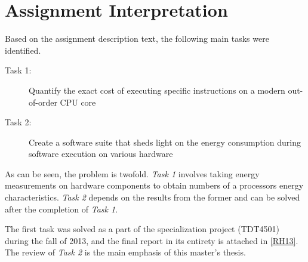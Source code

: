 \section{Assignment Interpretation}

Based on the assignment description text, the following main tasks were
identified.

\begin{description}
    \item[Task 1:] Quantify the exact cost of executing specific instructions on
        a modern out-of-order CPU core
    \item[Task 2:] Create a software suite that sheds light on the energy
        consumption during software execution on various hardware
\end{description}

As can be seen, the problem is twofold. \textit{Task 1} involves taking energy
measurements on hardware components to obtain numbers of a processors energy
characteristics. \textit{Task 2} depends on the results from the former and can
be solved after the completion of \textit{Task 1}.

The first task was solved as a part of the specialization project (TDT4501)
during the fall of 2013, and the final report in its entirety is attached in
\autoref{RH13}. The review of \textit{Task 2} is the main emphasis of this
master's thesis.
